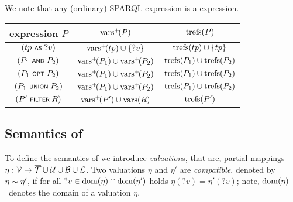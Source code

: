 \begin{note}
		We note that any
	(ordinary) SPARQL expression is a {\SPARQLplus} expression.
\end{note}



	\begin{tabular}{|c||c|c|} \hline
		{\SPARQLplus} expression $P$ &
		$\mathrm{vars}^+\!(P)$ &
		$\mathrm{trefs}(P)$
		\\ \hline
		\hline
		$(tp \text{ \normalfont\scriptsize\textsf{AS} } ?v)$ &
		$\mathrm{vars}^+\!(tp) \cup \lbrace ?v \rbrace$ &
		$\mathrm{trefs}(tp) \cup \lbrace tp \rbrace$
		\\ \hline
		$(P_1 \text{ \normalfont\scriptsize\textsf{AND} } P_2)$ &
		$\mathrm{vars}^+\!(P_1) \cup \mathrm{vars}^+\!(P_2)$ &
		$\mathrm{trefs}(P_1) \cup \mathrm{trefs}(P_2)$
		\\ \hline
		$(P_1 \text{ \normalfont\scriptsize\textsf{OPT} } P_2)$ &
		$\mathrm{vars}^+\!(P_1) \cup \mathrm{vars}^+\!(P_2)$ &
		$\mathrm{trefs}(P_1) \cup \mathrm{trefs}(P_2)$
		\\ \hline
		$(P_1 \text{ \normalfont\scriptsize\textsf{UNION} } P_2)$ &
		$\mathrm{vars}^+\!(P_1) \cup \mathrm{vars}^+\!(P_2)$ &
		$\mathrm{trefs}(P_1) \cup \mathrm{trefs}(P_2)$
		\\ \hline
		$(P' \text{ \normalfont\scriptsize\textsf{FILTER} } R)$ &
		$\mathrm{vars}^+\!(P') \cup \mathrm{vars}(R)$ &
		$\mathrm{trefs}(P')$
		\\ \hline
	\end{tabular}



\subsection{{\RDFplus} Semantics of {\SPARQLplus}}
	To define the semantics of {\SPARQLplus} we introduce
\emph{valuation}s, that are, partial mappings $\eta : \mathcal{V} \rightarrow \overline{\mathcal{T}} \cup \mathcal{U} \cup \mathcal{B} \cup \mathcal{L}$.
Two valuations $\eta$ and $\eta'$ are \emph{compatible}, denoted by $\eta \sim \eta'$, if for all $?v \in \mathrm{dom}(\eta) \cap \mathrm{dom}(\eta')$ holds $\eta(?v) = \eta'(?v)$; note,
	$\mathrm{dom}(\eta)$~denotes %
the domain of a valuation $\eta$.


